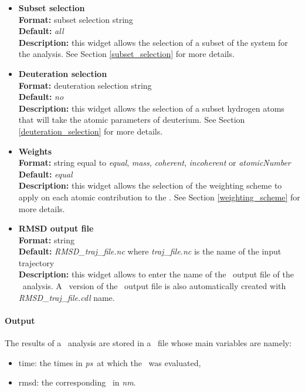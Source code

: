 \documentclass[a4paper,11pt]{report}
\newcommand{\nm}{\textit{nm}}
\newcommand{\ps}{\textit{ps}}
\begin{document}
\begin{itemize}
\hypertarget{rmsd_subset_selection}{}
\item \textbf{Subset selection}\\
\textbf{Format:} subset selection string\\
\textbf{Default:} \textit{all}\\
\textbf{Description:} this widget allows the selection of a subset of the system for the analysis. 
See Section \ref{subset_selection} for more details.

\hypertarget{rmsd_deuteration_selection}{}
\item \textbf{Deuteration selection}\\
\textbf{Format:} deuteration selection string\\
\textbf{Default:} \textit{no}\\
\textbf{Description:} this widget allows the selection of a subset hydrogen atoms that will take the atomic parameters 
of deuterium. See Section \ref{deuteration_selection} for more details.

\hypertarget{rmsd_weights}{}
\item \textbf{Weights}\\
\textbf{Format:} string equal to \textit{equal}, \textit{mass}, \textit{coherent}, \textit{incoherent} or \textit{atomicNumber}\\
\textbf{Default:} \textit{equal}\\
\textbf{Description:} this widget allows the selection of the weighting scheme to apply on each atomic contribution 
to the \RMSD . See Section \ref{weighting_scheme} for more details. 

\hypertarget{rmsd_rmsd_output_file}{}
\item \textbf{RMSD output file}\\
\textbf{Format:} string\\
\textbf{Default:} \textit{RMSD\_traj\_file.nc} where \textit{traj\_file.nc} is the name of the input trajectory\\
\textbf{Description:} this widget allows to enter the name of the \NetCDF\ output file of the \RMSD\ analysis. A \CDL\ 
version of the \NetCDF\ output file is also automatically created with \textit{RMSD\_traj\_file.cdl} name.
\end{itemize}

\paragraph{Output\\}
The results of a \RMSD\ analysis are stored in a \NetCDF\ file whose main variables are namely:
\begin{itemize}
\item time: the times in \ps\ at which the \RMSD\ was evaluated,
\item rmsd: the corresponding \RMSD\ in \nm .
\end{itemize}
\end{document}
